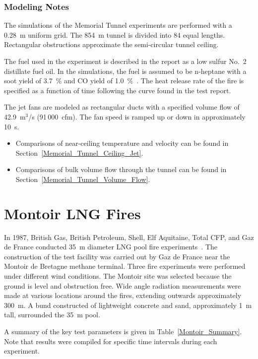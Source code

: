 \subsubsection{Modeling Notes}

The simulations of the Memorial Tunnel experiments are performed with a 0.28~m uniform grid. The 854~m tunnel is divided into 84 equal lengths. Rectangular obstructions approximate the semi-circular tunnel ceiling.

The fuel used in the experiment is described in the report as a low sulfur No.~2 distillate fuel oil. In the simulations, the fuel is assumed to be n-heptane with a soot yield of 3.7~\% and CO yield of 1.0~\%~\cite{SFPE:Tewarson}. The heat release rate of the fire is specified as a function of time following the curve found in the test report.

The jet fans are modeled as rectangular ducts with a specified volume flow of 42.9~m$^3$/s (91\,000~cfm). The fan speed is ramped up or down in approximately 10~s.

\begin{itemize}
\item Comparisons of near-ceiling temperature and velocity can be found in Section~\ref{Memorial_Tunnel_Ceiling_Jet}.
\item Comparisons of bulk volume flow through the tunnel can be found in Section~\ref{Memorial_Tunnel_Volume_Flow}.
\end{itemize}

\section{Montoir LNG Fires}
\label{Montoir_LNG_Fires_Description}

In 1987, British Gas, British Petroleum, Shell, Elf Aquitaine, Total CFP, and Gaz de France conducted 35~m diameter LNG pool fire experiments~\cite{Nedelka:1990}. The construction of the test facility was carried out by Gaz de France near the Montoir de Bretagne methane terminal. Three fire experiments were performed under different wind conditions. The Montoir site was selected because the ground is level and obstruction free. Wide angle radiation measurements were made at various locations around the fires, extending outwards approximately 300~m. A bund constructed of lightweight concrete and sand, approximately 1~m tall, surrounded the 35~m pool. 

A summary of the key test parameters is given in Table~\ref{Montoir_Summary}. Note that results were compiled for specific time intervals during each experiment.

